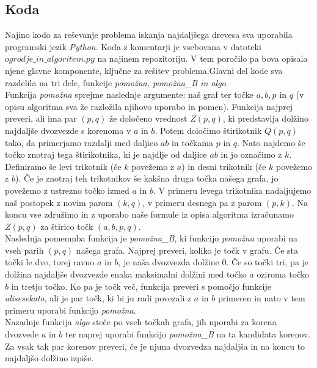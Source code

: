 \documentclass[a4paper,12pt]{article}
\begin{document}
\subsection{Koda}

Najino kodo za reševanje problema iskanja najdaljšega drevesa sva uporabila programski jezik \emph{Python}.
  Koda z komentarji je vsebovana v datoteki \emph{$ogrodje\_in\_algoritem.py$} na najinem repozitoriju.
   V tem poročilo pa bova opisala njene glavne komponente, ključne za rešitev problema.Glavni del kode sva razdelila na tri dele, funkcije \emph{pomožna, pomožna\_B in algo}. \\
Funkcija \emph{pomožna} sprejme naslednje argumente: naš graf ter točke $a, b, p$ in $q$ (v opisu algoritma sva že razložila njihovo uporabo in pomen).
 Funkcija najprej preveri, ali ima par $(p, q)$ že določeno vrednost $Z(p,q)$, 
 ki predstavlja dolžino najdaljše dvozvezde s korenoma v $a$ in $b$. Potem določimo štirikotnik $Q(p,q)$ tako, 
 da primerjamo razdalji med daljico $ab$ in točkama $p$ in $q$. 
 Nato najdemo še točko znotraj tega štirikotnika, ki je najdlje od daljice $ab$ in jo označimo z $k$.
  Definiramo še levi trikotnik (če $k$ povežemo z $a$) in desni trikotnik (če $k$ povežemo z $b$). 
  Če je znotraj teh trikotnikov še kakšna druga točka našega grafa, jo povežemo z ustrezno točko izmed $a$ in $b$.
   V primeru levega trikotnika nadaljujemo naš postopek z novim parom $(k,q)$, v primeru desnega pa z parom $(p, k)$.
    Na koncu vse združimo in z uporabo naše formule iz opisa algoritma izračunamo $Z(p,q)$ za štirico točk $(a, b, p, q)$. \\
Naslednja pomemnba funkcija je \emph{pomožna\_B}, ki funkcijo \emph{pomožna} uporabi na vseh parih $(p,q)$ našega grafa.
 Najprej preveri, koliko je točk v grafu. Če sta točki le dve, torej ravno $a$ in $b$, je naša dvozvezda dolžine $0$. 
 Če so točki tri, pa je dolžina najdaljše dvozvezde enaka maksimalni dolžini med točko $a$ oziroma točko $b$ in tretjo točko.
  Ko pa je točk več, funkcija preveri s pomočjo funkcije \emph{alisesekata}, ali je par točk,
   ki bi ju radi povezali z $a$ in $b$ primeren in nato v tem primeru uporabi funkcijo \emph{pomožna}. \\
Nazadnje funkcija \emph{algo} steče po vseh točkah grafa, jih uporabi za korena dvozvede $a$ in $b$ 
ter naprej uporabi funkcijo \emph{pomožna\_B} na ta kandidata korenov. 
Za vsak tak par korenov preveri, če je njuna dvozvedza najdaljša in na koncu to najdaljšo dolžino izpiše.   





	
\end{document}

